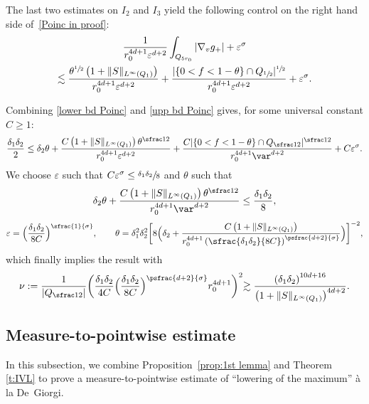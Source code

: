 The last two estimates on $I_2$ and $I_3$ yield the following
control on the right hand side of~\eqref{Poinc in proof}:
\begin{multline}
\label{upp bd Poinc}
\frac{1}{r_0^{4d+1} \varepsilon^{d+2}}
\int_{Q_{5r_0}} |\nabla_v g_+| +
\varepsilon^\sigma\\
\lesssim
\frac{\theta^{\sfrac12}\left(1+\|S\|_{L^\infty(Q_1)}\right)}{r_0^{4d+1}
\varepsilon^{d+2}}
+ \frac{|\{0<f<1-\theta\}\cap
Q_{\sfrac12}|^{\sfrac12}}{r_0^{4d+1}\varepsilon^{d+2}}
+ \varepsilon^\sigma.
\end{multline}

Combining \eqref{lower bd Poinc} and \eqref{upp bd Poinc} gives,
for some universal constant $C\geq 1$:
\begin{equation}
\label{estim finale}
\frac{\delta_1 \delta_2}{2} \le \delta_2 \theta +
\frac{C\left(1+\|S\|_{L^\infty(Q_1)} \right)
\theta^{\sfrac12}}{r_0^{4d+1} \varepsilon^{d+2}}
+ \frac{C|\{0<f<1-\theta\}\cap
Q_{\sfrac12}|^{\sfrac12}}{r_0^{4d+1} \var^{d+2}} + C \varepsilon^\sigma.
\end{equation}
We choose $\varepsilon$ such that
$C\varepsilon^\sigma \leq \sfrac{\delta_1 \delta_2}{8}$ and
$\theta$ such that
\[
\delta_2 \theta + \frac{C\left(1+\|S\|_{L^\infty(Q_1)}\right)
\theta^{\sfrac12}}{r_0^{4d+1}\var^{d+2}} \leq \frac{\delta_1
\delta_2}{8},
\]
\eg
\begin{equation}
\label{eq:choice-theta}
\varepsilon=\Bigl(\frac{\delta_1\delta_2}{8C}\Bigr)^{\sfrac{1}{\sigma}},
\qquad
\theta= \delta_1^2 \delta_2^2 \biggl[ 8\Bigl( \delta_2 +
\frac{C\left(1+\|S\|_{L^\infty(Q_1)}\right)}{r_0^{4d+1} \left(
\sfrac{\delta_1\delta_2}{8C}
\right)^{\psfrac{d+2}{\sigma}}}\Bigr) \biggr]^{-2},
\end{equation}
which finally implies the result with
\begin{equation}
\label{eq:choice-nu}
\nu:= \frac{1}{|Q_{\sfrac12}|}\biggl(\frac{\delta_1\delta_2}{4C}
\Bigl(\frac{\delta_1\delta_2}{8C}\Bigr)^{\psfrac{d+2}{\sigma}}
r_0^{4d+1}\biggl)^2 \gtrsim
\frac{\left( \delta_1 \delta_2
\right)^{10d+16}}{\left(1+\|S\|_{L^\infty(Q_1)}\right)^{4d+2}}.
\end{equation}

\subsection{Measure-to-pointwise estimate}
\label{ss:m2p}

In this subsection, we combine Proposition~\ref{prop:1st lemma}
and Theorem \ref{t:IVL} to prove a measure-to-pointwise estimate
of ``lowering of the maximum'' à la De~Giorgi.

